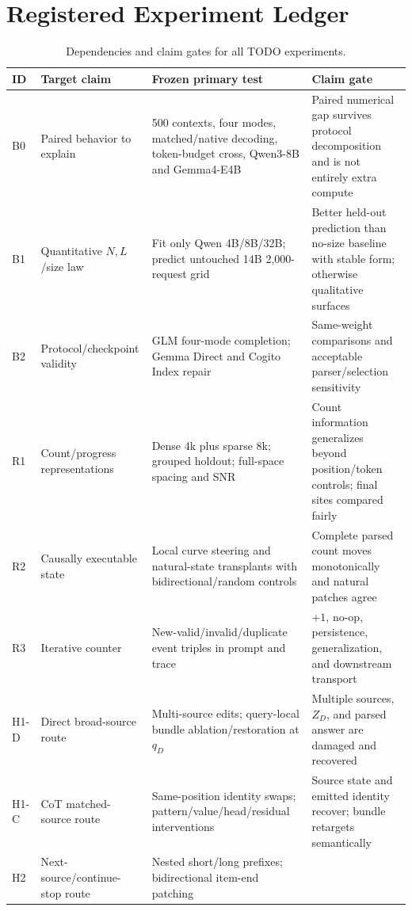 \section{Registered Experiment Ledger}
\label{app:ledger}

\begin{table}[H]
\centering
\scriptsize
\caption{Dependencies and claim gates for all TODO experiments.}
\begin{tabularx}{\textwidth}{@{}P{.07\textwidth}P{.19\textwidth}P{.36\textwidth}Y@{}}
\toprule
ID & Target claim & Frozen primary test & Claim gate \\
\midrule
B0 & Paired behavior to explain
  & 500 contexts, four modes, matched/native decoding, token-budget cross, Qwen3-8B and Gemma4-E4B
  & Paired numerical gap survives protocol decomposition and is not entirely extra compute \\
B1 & Quantitative \(N,L\)/size law
  & Fit only Qwen 4B/8B/32B; predict untouched 14B 2,000-request grid
  & Better held-out prediction than no-size baseline with stable form; otherwise qualitative surfaces \\
B2 & Protocol/checkpoint validity
  & GLM four-mode completion; Gemma Direct and Cogito Index repair
  & Same-weight comparisons and acceptable parser/selection sensitivity \\
R1 & Count/progress representations
  & Dense 4k plus sparse 8k; grouped holdout; full-space spacing and SNR
  & Count information generalizes beyond position/token controls; final sites compared fairly \\
R2 & Causally executable state
  & Local curve steering and natural-state transplants with bidirectional/random controls
  & Complete parsed count moves monotonically and natural patches agree \\
R3 & Iterative counter
  & New-valid/invalid/duplicate event triples in prompt and trace
  & \(+1\), no-op, persistence, generalization, and downstream transport \\
H1-D & Direct broad-source route
  & Multi-source edits; query-local bundle ablation/restoration at \(q_D\)
  & Multiple sources, \(Z_D\), and parsed answer are damaged and recovered \\
H1-C & CoT matched-source route
  & Same-position identity swaps; pattern/value/head/residual interventions
  & Source state and emitted identity recover; bundle retargets semantically \\
H2 & Next-source/continue-stop route
  & Nested short/long prefixes; bidirectional item-end patching

\end{tabularx}
\end{table}
